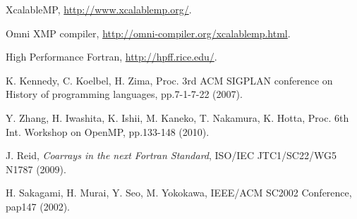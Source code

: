 %
%
% 
% 
%
\begin{thebibliography}{99.}%
%
%
%
%
%
 XcalableMP, \url{http://www.xcalablemp.org/}.

 Omni XMP compiler, \url{http://omni-compiler.org/xcalablemp.html}.

 High Performance Fortran, \url{http://hpff.rice.edu/}.

 K. Kennedy, C. Koelbel, H. Zima, Proc. 3rd ACM SIGPLAN conference on History of programming languages, pp.7-1-7-22 (2007).

 Y. Zhang, H. Iwashita, K. Ishii, M. Kaneko, T. Nakamura, K. Hotta, Proc. 6th Int. Workshop on OpenMP, pp.133-148 (2010).

 J. Reid, {\it Coarrays in the next Fortran Standard}, ISO/IEC JTC1/SC22/WG5 N1787 (2009).

 H. Sakagami, H. Murai, Y. Seo, M. Yokokawa, IEEE/ACM SC2002 Conference, pap147 (2002).

\end{thebibliography}
